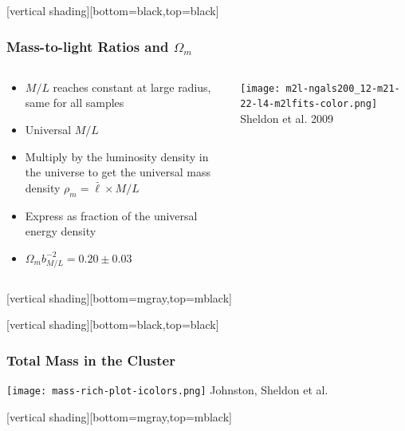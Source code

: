 \documentclass{beamer}
\begin{document}
{
    [vertical shading][bottom=black,top=black]


    \frame
    {
        \frametitle{Mass-to-light Ratios and $\Omega_m$}

        \begin{columns}
            \begin{column}{0.6\textwidth}
                \begin{itemize}
                    \item $M/L$ reaches constant at large radius, same for all samples
                    \item Universal $M/L$

                    \item Multiply by the luminosity density in the universe to
                        get the universal mass density {\color{gold} $\rho_m = \bar{\ell} \times M/L$ }


                    \item Express as fraction of the universal energy density

                    \item {\color{gold} $\Omega_m b_{M/L}^{-2} = 0.20 \pm 0.03$ }

                \end{itemize}
            \end{column}
            \begin{column}{0.4\textwidth}
                \centering
                \texttt{[image: m2l-ngals200\_12-m21-22-l4-m2lfits-color.png]}
                \newline
                {\color{gold}Sheldon et al. 2009}
            \end{column}
        \end{columns}
    }


    [vertical shading][bottom=mgray,top=mblack]
}



{
    [vertical shading][bottom=black,top=black]


    \frame
    {
        \frametitle{Total Mass in the Cluster}

        \begin{center}
            \texttt{[image: mass-rich-plot-icolors.png]}
            \newline
            \hfill {\color{gold} Johnston, Sheldon et al.}
        \end{center}
    }
    [vertical shading][bottom=mgray,top=mblack]
}
\end{document}
